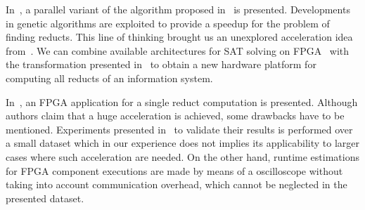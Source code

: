 \documentclass[11pt]{article}   %
\begin{document}
  In~\cite{Wroblewski98}, a parallel variant of the algorithm proposed in~\cite{Wroblewski95} is presented.
  Developments in genetic algorithms are exploited to provide a speedup for the problem of finding reducts.
  This line of thinking brought us an unexplored acceleration idea from~\cite{Jensen14}. We can combine 
  available architectures for SAT solving on FPGA~\cite{Safar07,Kanazawa11} with the transformation
  presented in~\cite{Jensen14} to obtain a new hardware platform for computing all reducts of an information 
  system.
  
  In~\cite{Grzes13,Kopczynski14}, an FPGA application for a single reduct computation is presented. Although
  authors claim that a huge acceleration is achieved, some drawbacks have to be mentioned. Experiments presented 
  in~\cite{Kopczynski14} to validate their results is performed over a small dataset which in our experience 
  does not implies its applicability to larger cases where such acceleration are needed. On the other hand, 
  runtime estimations for FPGA component executions are made by means of a oscilloscope without taking into 
  account communication overhead, which cannot be neglected in the presented dataset.

  
\end{document}

